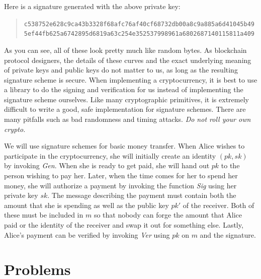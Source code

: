 Here is a signature generated with the above private key:

\begin{quote}
\texttt{c538752e628c9ca43b3328f68afc76af40cf68732db00a8c9a885a6d41045b49}\linebreak
\texttt{5ef44fb625a6742895d6819a63c254e352537998961a6802687140115811a409}
\end{quote}

As you can see, all of these look pretty much like random bytes.
As blockchain protocol designers,
the details of these curves and the exact underlying meaning of private keys and public keys
do not matter to us, as long as the resulting signature
scheme is secure. When implementing a cryptocurrency, it is best to use a library
to do the signing and verification for us instead of implementing the signature
scheme ourselves. Like many cryptographic primitives, it is extremely difficult to
write a good, safe implementation for signature schemes. There are many pitfalls
such as bad randomness and timing attacks. \emph{Do not roll your own crypto.}

We will use signature schemes for basic money transfer. When Alice wishes to participate
in the cryptocurrency, she will initially create an identity $(pk, sk)$ by invoking
\emph{Gen}. When she is ready to get paid, she will hand out $pk$ to the person wishing to
pay her. Later, when the time comes for her to spend her money, she will authorize a payment
by invoking the function \emph{Sig} using her private key $sk$. The message describing
the payment must contain both the amount that she is spending as well as the public key
$pk'$ of the receiver. Both of these must be included in $m$ so that nobody can forge
the amount that Alice paid or the identity of the receiver and swap it out for something
else. Lastly, Alice's payment can be verified by invoking \emph{Ver} using $pk$ on $m$ and the signature.

\section*{Problems}

